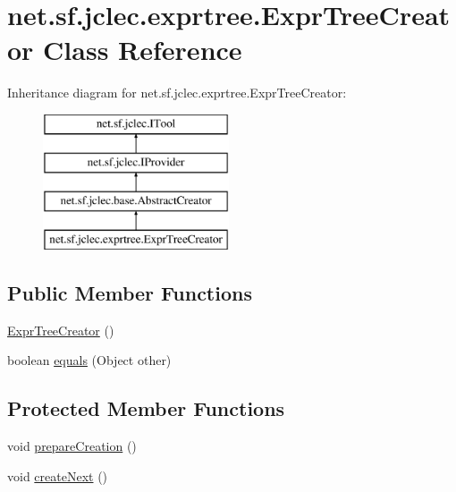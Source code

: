 \hypertarget{classnet_1_1sf_1_1jclec_1_1exprtree_1_1_expr_tree_creator}{\section{net.\-sf.\-jclec.\-exprtree.\-Expr\-Tree\-Creator Class Reference}
\label{classnet_1_1sf_1_1jclec_1_1exprtree_1_1_expr_tree_creator}
}
Inheritance diagram for net.\-sf.\-jclec.\-exprtree.\-Expr\-Tree\-Creator\-:\begin{figure}[H]
\begin{center}
\leavevmode
\includegraphics[height=4.000000cm]{classnet_1_1sf_1_1jclec_1_1exprtree_1_1_expr_tree_creator}
\end{center}
\end{figure}
\subsection*{Public Member Functions}
\begin{DoxyCompactItemize}
\item 
\hyperlink{classnet_1_1sf_1_1jclec_1_1exprtree_1_1_expr_tree_creator_a0c3dfd902ef8e98a574c84a410112589}{Expr\-Tree\-Creator} ()
\item 
boolean \hyperlink{classnet_1_1sf_1_1jclec_1_1exprtree_1_1_expr_tree_creator_ae8b64669effe635a411cde20bc3067c1}{equals} (Object other)
\end{DoxyCompactItemize}
\subsection*{Protected Member Functions}
\begin{DoxyCompactItemize}
\item 
void \hyperlink{classnet_1_1sf_1_1jclec_1_1exprtree_1_1_expr_tree_creator_a00264d7b01aa199cc1263302a503e378}{prepare\-Creation} ()
\item 
void \hyperlink{classnet_1_1sf_1_1jclec_1_1exprtree_1_1_expr_tree_creator_afbb105f831c250f0ec1309536359bd63}{create\-Next} ()
\end{DoxyCompactItemize}
